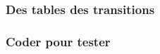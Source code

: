 \subsubsection{Des tables des transitions} \label{2-or-3}

    


\subsubsection{Coder pour tester}

    

